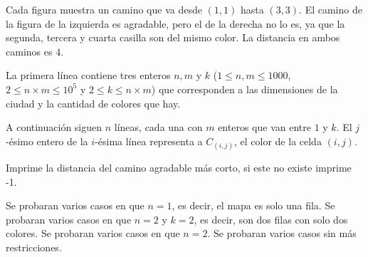 \documentclass{oci}
\begin{document}
\begin{problemDescription}
Cada figura muestra un camino que va desde $(1,1)$ hasta $(3,3)$.
%
El camino de la figura de la izquierda es agradable, pero el de la derecha
no lo es, ya que la segunda, tercera y cuarta casilla son del mismo color.
%
La distancia en ambos caminos es $4$.

\end{problemDescription}


\begin{inputDescription}
La primera línea contiene tres enteros $n, m$ y $k$
($1 \leq n, m \leq 1000$, $2 \leq n\times m \leq 10^5$ y $2 \leq k \leq n \times m$)
que corresponden a las dimensiones de la ciudad y la cantidad de colores que hay.

A continuación siguen $n$ líneas, cada una con $m$ enteros que van entre $1$ y $k$.
%
El $j$-ésimo entero de la $i$-ésima línea representa a $C_{(i,j)}$, el color de la celda $(i,j)$.

\end{inputDescription}

\begin{outputDescription}
Imprime la distancia del camino agradable más corto, si este no existe imprime -1.

\end{outputDescription}

\begin{scoreDescription}
  Se probaran varios casos en que $n = 1$, es decir, el mapa es solo una fila.
  Se probaran varios casos en que $n = 2$ y $k = 2$, es decir, son dos filas con solo dos colores.
  Se probaran varios casos en que $n = 2$.
  Se probaran varios casos sin más restricciones.
\end{scoreDescription}

\begin{sampleDescription}
\end{sampleDescription}
\end{document}
